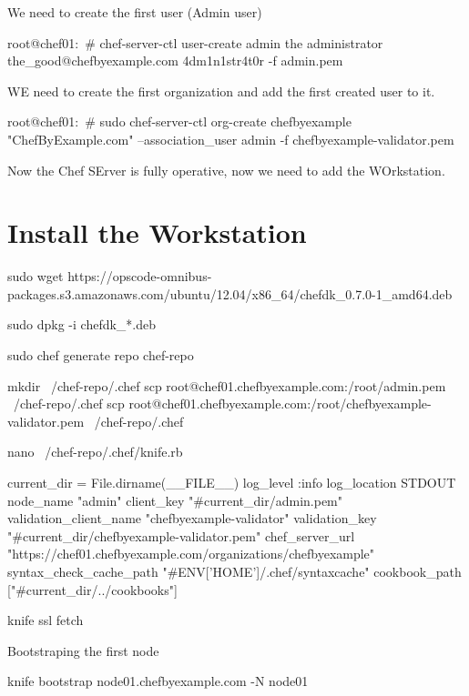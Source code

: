 We need to create the first user (Admin user)

\begin{codelisting}
\label{code:}
\codecaption{}
\begin{code}
root@chef01:~# chef-server-ctl user-create admin the administrator the_good@chefbyexample.com 4dm1n1str4t0r -f admin.pem
\end{code}
\end{codelisting}

WE need to create the first organization and add the first created user to it.

\begin{codelisting}
\label{code:}
\codecaption{}
\begin{code}
root@chef01:~# sudo chef-server-ctl org-create chefbyexample "ChefByExample.com" --association_user admin -f chefbyexample-validator.pem
\end{code}
\end{codelisting}


Now the Chef SErver is fully operative, now we need to add the WOrkstation.

\section{Install the Workstation}

\begin{codelisting}
\label{code:}
\codecaption{}
\begin{code}

sudo wget https://opscode-omnibus-packages.s3.amazonaws.com/ubuntu/12.04/x86_64/chefdk_0.7.0-1_amd64.deb

sudo dpkg -i chefdk_*.deb

sudo chef generate repo chef-repo

mkdir ~/chef-repo/.chef
scp root@chef01.chefbyexample.com:/root/admin.pem ~/chef-repo/.chef
scp root@chef01.chefbyexample.com:/root/chefbyexample-validator.pem ~/chef-repo/.chef

nano ~/chef-repo/.chef/knife.rb


current_dir = File.dirname(__FILE__)
log_level                :info
log_location             STDOUT
node_name                "admin"
client_key               "#{current_dir}/admin.pem"
validation_client_name   "chefbyexample-validator"
validation_key           "#{current_dir}/chefbyexample-validator.pem"
chef_server_url          "https://chef01.chefbyexample.com/organizations/chefbyexample"
syntax_check_cache_path  "#{ENV['HOME']}/.chef/syntaxcache"
cookbook_path            ["#{current_dir}/../cookbooks"]


knife ssl fetch

Bootstraping the first node

knife bootstrap node01.chefbyexample.com -N node01


\end{code}
\end{codelisting}

